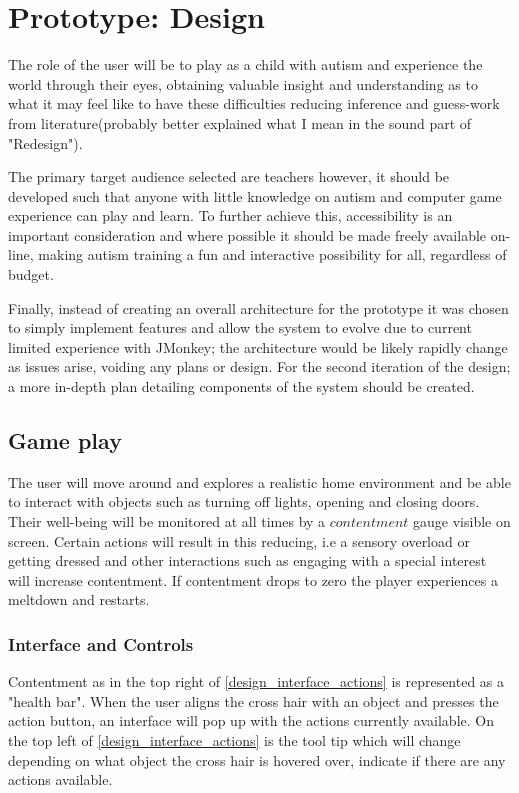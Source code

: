 \chapter{Prototype: Design}
The role of the user will be to play as a child with autism and experience the world through their eyes, obtaining valuable insight and understanding as to what it may feel like to have these difficulties reducing inference and guess-work from literature(probably better explained what I mean in the sound part of "Redesign").

The primary target audience selected are teachers however, it should be developed such that anyone with little knowledge on autism and computer game experience can play and learn. To further achieve this, accessibility is an important consideration and where possible it should be made freely available on-line, making autism training a fun and interactive possibility for all, regardless of budget.  

Finally, instead of creating an overall architecture for the prototype it was chosen to simply implement features and allow the system to evolve due to current limited experience with JMonkey; the architecture would be likely rapidly change as issues arise, voiding any plans or design. For the second iteration of the design; a more in-depth plan detailing components of the system should be created.

\section{Game play}

The user will move around and explores a realistic home environment and be able to interact with objects such as turning off lights, opening and closing doors. Their well-being will be monitored at all times by a $contentment$ gauge visible on screen. Certain actions will result in this reducing, i.e a sensory overload or getting dressed and other interactions such as engaging with a special interest will increase contentment. If contentment drops to zero the player experiences a meltdown and restarts. 

\subsection{Interface and Controls}

Contentment as in the top right of \ref{design_interface_actions} is represented as a "health bar". When the user aligns the cross hair with an object and presses the action button, an interface will pop up with the actions currently available. On the top left of \ref{design_interface_actions} is the tool tip which will change depending on what object the cross hair is hovered over, indicate if there are any actions available. 

